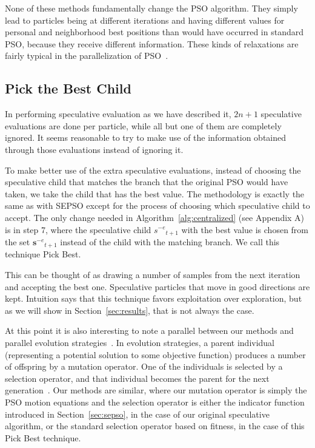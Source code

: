 \documentclass[smallcondensed]{svjour3}
\renewcommand{\sec}[1]{Section~\ref{sec:#1}}
\newcommand{\alg}[1]{Algorithm~\ref{alg:#1}}
\providecommand{\noeval}[1]{\ensuremath{#1^{-e}}}
\providecommand{\s}{\ensuremath{s}}
\providecommand{\sset}{\ensuremath{\mathbf{s}}}
\begin{document}
None of these methods fundamentally change the PSO algorithm.  They simply lead
to particles being at different iterations and having different values for
personal and neighborhood best positions than would have occurred in standard
PSO, because they receive different information.  These kinds of relaxations
are fairly typical in the parallelization of
PSO~\citep{koh-2006-parallel-asynchronous-pso}.

\subsection{Pick the Best Child}
\label{sec:pickbest}

In performing speculative evaluation as we have described it, $2n+1$
speculative evaluations are done per particle, while all but one of them are
completely ignored.  It seems reasonable to try to make use of the information
obtained through those evaluations instead of ignoring it.

To make better use of the extra speculative evaluations, instead of choosing
the speculative child that matches the branch that the original PSO would have
taken, we take the child that has the best value.  The methodology is exactly
the same as with SEPSO except for the process of choosing which speculative
child to accept.  The only change needed in \alg{centralized} (see Appendix A)
is in step 7, where the speculative child $\noeval{\s}_{t+1}$ with the best
value is chosen from the set $\noeval{\sset}_{t+1}$ instead of the child with
the matching branch.  We call this technique Pick Best.

This can be thought of as drawing a number of samples from the next iteration
and accepting the best one.  Speculative particles that move in good directions
are kept.  Intuition says that this technique favors exploitation over
exploration, but as we will show in \sec{results}, that is not always the case.

At this point it is also interesting to note a parallel between our methods and
parallel evolution
strategies~\citep{rudolph-1991-distributed-evolution-strategies}.  In evolution
strategies, a parent individual (representing a potential solution to some
objective function) produces a number of offspring by a mutation operator.  One
of the individuals is selected by a selection operator, and that individual
becomes the parent for the next
generation~\citep{beyer-2002-evolution-strategies}.  Our methods are similar,
where our mutation operator is simply the PSO motion equations and the
selection operator is either the indicator function introduced in \sec{sepso},
in the case of our original speculative algorithm, or the standard selection
operator based on fitness, in the case of this Pick Best technique.
\end{document}
